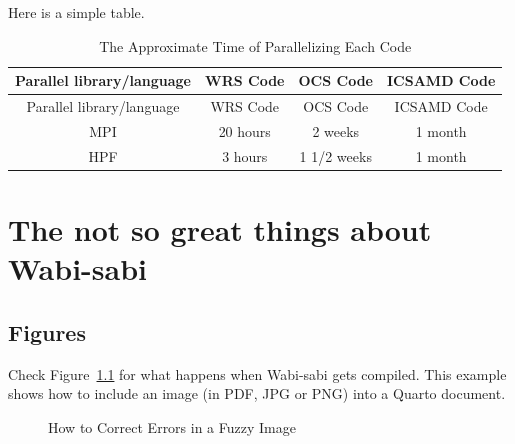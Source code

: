 \documentclass[
  dissertation]{bsu-cs}
\begin{document}
Here is a simple table.

\begin{longtable}[]{@{}cccc@{}}
\caption{The Approximate Time of Parallelizing Each
Code}\label{tbl-table4}\tabularnewline
\toprule\noalign{}
Parallel library/language & WRS Code & OCS Code & ICSAMD Code \\
\midrule\noalign{}
\endfirsthead
\toprule\noalign{}
Parallel library/language & WRS Code & OCS Code & ICSAMD Code \\
\midrule\noalign{}
\endhead
\bottomrule\noalign{}
\endlastfoot
MPI & 20 hours & 2 weeks & 1 month \\
HPF & 3 hours & 1 1/2 weeks & 1 month \\
\end{longtable}

\chapter{The not so great things about Wabi-sabi}

\section{Figures}\label{figures}

Check Figure~\ref{fig-fuzzyImage} for what happens when Wabi-sabi gets
compiled. This example shows how to include an image (in PDF, JPG or
PNG) into a Quarto document.

\begin{figure}


\caption{\label{fig-fuzzyImage}How to Correct Errors in a Fuzzy Image}

\end{figure}%
\end{document}
